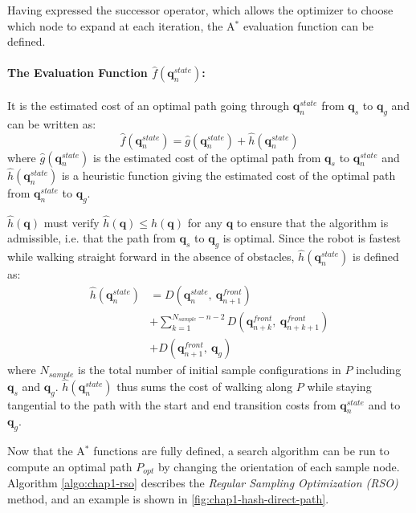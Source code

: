 Having expressed the successor operator, which allows the optimizer to
choose which node to expand at each iteration, the A$^{*}$ evaluation
function can be defined.

\paragraph{The Evaluation Function $\hat{f}(\mathbf{q}_n^{state})$:}
It is the estimated cost of an optimal path going through
$\mathbf{q}_n^{state}$ from $\mathbf{q}_s$ to $\mathbf{q}_g$ and can be written as:
\begin{equation}
  \hat{f}(\mathbf{q}_n^{state}) = \hat{g}(\mathbf{q}_n^{state}) +
  \hat{h}(\mathbf{q}_n^{state})
\end{equation}
where $\hat{g}(\mathbf{q}_n^{state})$ is the estimated cost of the
optimal path from $\mathbf{q}_s$ to $\mathbf{q}_n^{state}$ and
$\hat{h}(\mathbf{q}_n^{state})$ is a heuristic function giving the
estimated cost of the optimal path from $\mathbf{q}_n^{state}$ to
$\mathbf{q}_g$.

$\hat{h}(\mathbf{q})$ must verify $\hat{h}(\mathbf{q}) \leq
h(\mathbf{q})$ for any $\mathbf{q}$ to ensure that the algorithm is
admissible, i.e. that the path from $\mathbf{q}_s$ to $\mathbf{q}_g$
is optimal. Since the robot is fastest while walking straight forward
in the absence of obstacles, $\hat{h}(\mathbf{q}_n^{state})$ is
defined as:
\begin{equation}
  \begin{split}
  \hat{h}(\mathbf{q}_n^{state}) &= D(\mathbf{q}_n^{state},~\mathbf{q}_{n+1}^{front}) \\
  &+ \sum_{k=1}^{N_{sample}-n-2} D(\mathbf{q}_{n+k}^{front},~\mathbf{q}_{n+k+1}^{front}) \\
  &+ D(\mathbf{q}_{n+1}^{front},~\mathbf{q}_g)
  \end{split}
\end{equation}
where $N_{sample}$ is the total number of initial sample
configurations in $P$ including $\mathbf{q}_s$ and
$\mathbf{q}_g$. $\hat{h}(\mathbf{q}_n^{state})$ thus sums the cost of
walking along $P$ while staying tangential to the path with the start
and end transition costs from $\mathbf{q}_n^{state}$ and to
$\mathbf{q}_g$.

Now that the A$^{*}$ functions are fully defined, a search algorithm
can be run to compute an optimal path $P_{opt}$ by changing the
orientation of each sample node. Algorithm \ref{algo:chap1-rso}
describes the \emph{Regular Sampling Optimization (RSO)} method, and
an example is shown in \autoref{fig:chap1-hash-direct-path}.


